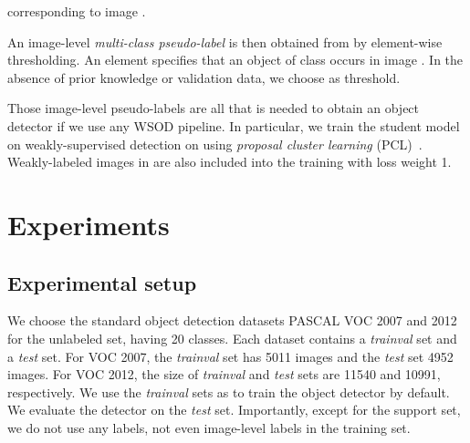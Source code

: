 \documentclass[review]{elsarticle}
\begin{document}
corresponding to image .


An image-level \emph{multi-class pseudo-label}  is then obtained from  by element-wise thresholding. An element  specifies that an object of class  occurs in image . In the absence of prior knowledge or validation data, we choose  as threshold. 

{Those image-level pseudo-labels are all that is needed to obtain an object detector if we use any WSOD pipeline. In particular, we train the student model  on weakly-supervised detection on  using \emph{proposal cluster learning} (PCL)~\cite{tang2018pami}. Weakly-labeled images in  are also included into the training with loss weight 1.} 


\miaojing{
}



























%
 
\section{Experiments}
\label{sec:exp}

\subsection{Experimental setup}
\label{Sec:setup}

We choose the standard object detection datasets PASCAL VOC 2007 and 2012~\cite{pascalvoc} {for the unlabeled set}, having 20 classes. Each dataset contains a \emph{trainval} set and a \emph{test} set. For VOC 2007, the \emph{trainval} set has 5011 images and the \emph{test} set 4952 images. For VOC 2012, the size of \emph{trainval} and \emph{test} sets are 11540 and 10991, respectively.
{We use the \emph{trainval} sets as  to train the object detector by default.  We evaluate the detector on the \emph{test} set.}
{Importantly, except for the support set, we do not use any labels, not even image-level labels in the training set.}
\end{document}
